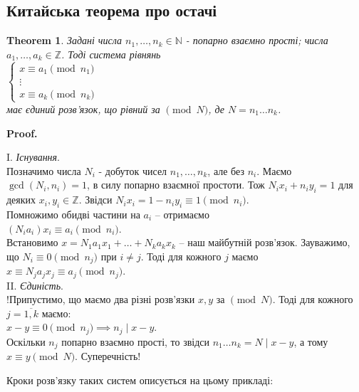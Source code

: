 \documentclass[a4paper, 14pt]{extarticle}
\makeatletter
\theoremstyle{theoremdd}
\newtheorem{theorem}{Theorem}[subsection]
\theoremstyle{theoremdd}
\theoremstyle{theoremdd}
\theoremstyle{theoremdd}
\theoremstyle{theoremdd}
\theoremstyle{theoremdd}
\theoremstyle{theoremdd}
\theoremstyle{theoremdd}
\def\qed{$\blacksquare$}
\renewenvironment{proof}[1][Proof.\\]{\par
\pushQED{\hfill \qed}%
\normalfont \topsep6\p@\@plus6\p@\relax
\trivlist
\item\relax
{\bfseries
#1\@addpunct{.}}\hspace\labelsep\ignorespaces
}{%
\popQED\endtrivlist\@endpefalse
}
\makeatother
\begin{document}
\subsection{Китайська теорема про остачі}
\begin{theorem}
Задані числа $n_1,\dots,n_k \in \mathbb{N}$ - попарно взаємно прості; числа $a_1,\dots,a_k \in \mathbb{Z}$. Тоді система рівнянь\\
$\begin{cases}
x \equiv a_1 \pmod {n_1} \\
\vdots \\
x \equiv a_k \pmod {n_k}
\end{cases}$\\
має єдиний розв'язок, що рівний за $\!\pmod N$, де $N = n_1 \dots n_k$.
\end{theorem}

\begin{proof}
I. \textit{Існування}.\\
Позначимо числа $N_i$ - добуток чисел $n_1,\dots,n_k$, але без $n_i$. Маємо \\ $\gcd(N_i,n_i) = 1$, в силу попарно взаємної простоти. Тож $N_i x_i + n_i y_i = 1$ для деяких $x_i,y_i \in \mathbb{Z}$. Звідси $N_ix_i = 1 - n_i y_i \equiv 1 \pmod {n_i}$.\\
Помножимо обидві частини на $a_i$ -- отримаємо\\
$(N_ia_i)x_i \equiv a_i \pmod {n_i}$.\\
Встановимо $x = N_1a_1x_1 + \dots + N_k a_k x_k$ -- наш майбутній розв'язок. Зауважимо, що $N_i \equiv 0 \pmod {n_j}$ при $i \neq j$. Тоді для кожного $j$ маємо\\
$x \equiv N_ja_jx_j \equiv a_j \pmod {n_j}$.
\bigskip \\
II. \textit{Єдиність}.\\
!Припустимо, що маємо два різні розв'язки $x,y$ за $\pmod N$. Тоді для кожного $j = \overline{1,k}$ маємо:\\
$x-y \equiv 0 \pmod{n_j} \implies n_j \mid x-y$.\\
Оскільки $n_j$ попарно взаємно прості, то звідси $n_1 \dots n_k = N \mid x-y$, а тому $x \equiv y \pmod {N}$. Суперечність!
\end{proof}

Кроки розв'язку таких систем описується на цьому прикладі:
\end{document}
